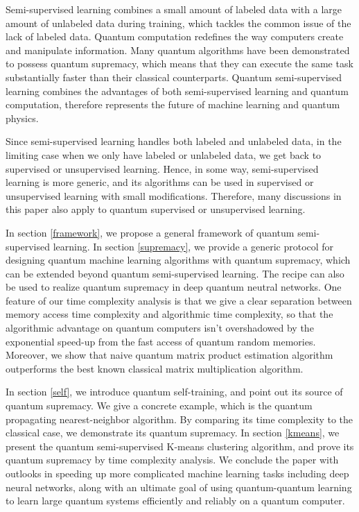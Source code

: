 \documentclass[11pt]{article}
\theoremstyle{definition}
\begin{document}
Semi-supervised learning \cite{zhu2009introduction} combines a small amount of labeled data with a large amount of unlabeled data during training, which tackles the common issue of the lack of labeled data. Quantum computation \cite{NielsenChuang} redefines the way computers create and manipulate information. Many quantum algorithms \cite{deutsch1992rapid, shor1994algorithms, grover1996fast, bernstein1997quantum, simon1997power, lloyd2013quantum, arute2019quantum} have been demonstrated to possess quantum supremacy, which means that they can execute the same task substantially faster than their classical counterparts. Quantum semi-supervised learning combines the advantages of both semi-supervised learning and quantum computation, therefore represents the future of machine learning and quantum physics.




Since semi-supervised learning handles both labeled and unlabeled data, in the limiting case when we only have labeled or unlabeled data, we get back to supervised or unsupervised learning. Hence, in some way, semi-supervised learning is more generic, and its algorithms can be used in supervised or unsupervised learning with small modifications. Therefore, many discussions in this paper also apply to quantum supervised or unsupervised learning.

In section \ref{framework}, we propose a general framework of quantum semi-supervised learning. In section \ref{supremacy}, we provide a generic protocol for designing quantum machine learning algorithms with quantum supremacy, which can be extended beyond quantum semi-supervised learning. The recipe can also be used to realize quantum supremacy in deep quantum neutral networks. One feature of our time complexity analysis is that we give a clear separation between memory access time complexity and algorithmic time complexity, so that the algorithmic advantage on quantum computers isn't overshadowed by the exponential speed-up from the fast access of quantum random memories. Moreover, we show that naive quantum matrix product estimation algorithm outperforms the best known classical matrix multiplication algorithm.

In section \ref{self}, we introduce quantum self-training, and point out its source of quantum supremacy. We give a concrete example, which is the quantum propagating nearest-neighbor algorithm. By comparing its time complexity to the classical case, we demonstrate its quantum supremacy. In section \ref{kmeans}, we present the quantum semi-supervised K-means clustering algorithm, and prove its quantum supremacy by time complexity analysis. 
We conclude the paper with outlooks in speeding up more complicated machine learning tasks including deep neural networks, along with an ultimate goal of using quantum-quantum learning to learn large quantum systems efficiently and reliably on a quantum computer.
\end{document}
